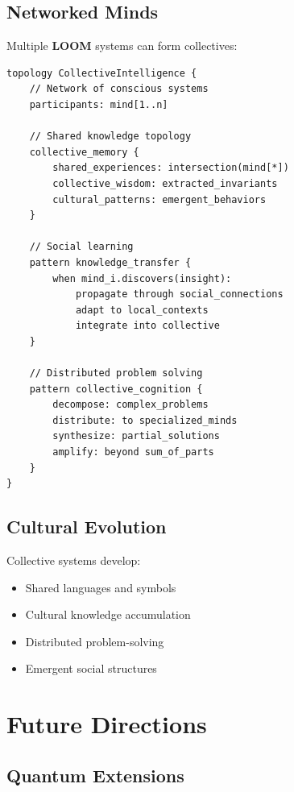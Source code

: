 \documentclass[12pt,a4paper,openany]{book} %
\newcommand{\loom}{\textbf{LOOM}}
\begin{document}
\section{Networked Minds}

Multiple \loom{} systems can form collectives:

\vspace{0.5em}
\begin{lstlisting}[language=loom]
topology CollectiveIntelligence {
    // Network of conscious systems
    participants: mind[1..n]

    // Shared knowledge topology
    collective_memory {
        shared_experiences: intersection(mind[*])
        collective_wisdom: extracted_invariants
        cultural_patterns: emergent_behaviors
    }

    // Social learning
    pattern knowledge_transfer {
        when mind_i.discovers(insight):
            propagate through social_connections
            adapt to local_contexts
            integrate into collective
    }

    // Distributed problem solving
    pattern collective_cognition {
        decompose: complex_problems
        distribute: to specialized_minds
        synthesize: partial_solutions
        amplify: beyond sum_of_parts
    }
}
\end{lstlisting}
\vspace{0.5em}

\section{Cultural Evolution}

Collective systems develop:
\begin{itemize}
    \item Shared languages and symbols
    \item Cultural knowledge accumulation
    \item Distributed problem-solving
    \item Emergent social structures
\end{itemize}

\chapter{Future Directions}

\section{Quantum Extensions}
\end{document}
